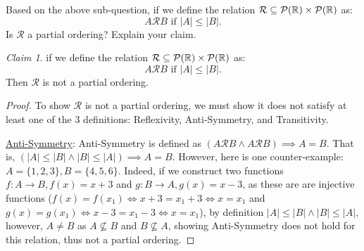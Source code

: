 \documentclass{homework}
\newcommand{\T}[1]{\text{#1}}
\newcommand{\R}{\bb{R}} %
\newcommand{\Pset}[1]{\mathcal{P}(#1)} %
\newcommand{\Relate}[2]{#1\mathcal{R}#2} %
\newcommand{\relate}{\mathcal{R}}
\newcommand{\ra}{\rightarrow}
\newcommand{\?}{\stackrel{?}{=}}
\theoremstyle{remark}
\newtheorem*{claim}{Claim}
\begin{document}
\question[2] Based on the above sub-question, if we define the relation $\mathcal{R}\subseteq\Pset{\R}\times\Pset{\R}$ as: $$\Relate{A}{B}\T{ if }|A|\leq|B|.$$ Is $\relate$ a partial ordering? Explain your claim. 
\begin{claim}
    if we define the relation $\mathcal{R}\subseteq\Pset{\R}\times\Pset{\R}$ as: $$\Relate{A}{B}\T{ if }|A|\leq|B|.$$ Then $\relate$ is not a partial ordering.
\end{claim}
\begin{proof}
To show $\relate$ is not a partial ordering, we must show it does not satisfy at least one of the 3 definitions: Reflexivity, Anti-Symmetry, and Transitivity.


\underline{Anti-Symmetry}: Anti-Symmetry is defined as $(\Relate{A}{B}\land\Relate{A}{B})\implies A=B$. That is, $(|A|\leq|B|\land|B|\leq|A|)\implies A=B$. However, here is one counter-example: $A=\{1,2,3\}, B=\{4,5,6\}$. Indeed, if we construct two functions $f: A\ra B, f(x)=x+3$ and $g:B\ra A, g(x)=x-3$, as these are are injective functions ($f(x)=f(x_1)\iff x+3=x_1+3 \iff x=x_1$ and $g(x)=g(x_1)\iff x-3=x_1-3\iff x=x_1$), by definition $|A|\leq|B|\land|B|\leq|A|$, however, $A\neq B$ as $A\not\subseteq B$ and $B\not\subseteq A$, showing Anti-Symmetry does not hold for this relation, thus not a partial ordering. 
\end{proof}


\newpage
\end{document}
